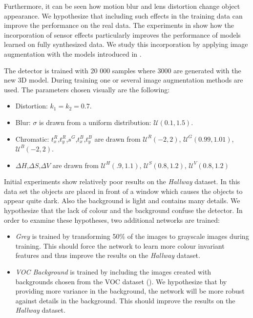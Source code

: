 Furthermore, it can be seen how motion blur and lens distortion change object appearance. We hypothesize that including such effects in the training data can improve the performance on the real data. The experiments in \cite{Carlson2018} show how the incorporation of sensor effects particularly improves the performance of models learned on fully synthesized data. We study this incorporation by applying image augmentation with the models introduced in .

The detector is trained with 20 000 samples where 3000 are generated with the new 3D model. During training one or several image augmentation methods are used. The parameters chosen visually are the following:

\begin{itemize}
	\item Distortion: $k_1 = k_2 = 0.7$.
	\item Blur: $\sigma$ is drawn from a uniform distribution: $\mathcal{U}(0.1,1.5)$.
	\item Chromatic: $t^R_x$,$t^R_y$,$s^G$,$t^B_x$,$t^B_y$ are drawn from $\mathcal{U}^R(-2,2)$, $\mathcal{U}^G(0.99,1.01)$,$\mathcal{U}^B(-2,2)$.
	\item $\Delta H$,$\Delta S$,$\Delta V$ are drawn from $\mathcal{U}^H(.9, 1.1)$, $\mathcal{U}^S(0.8, 1.2)$, $\mathcal{U}^V(0.8, 1.2)$
\end{itemize}

Initial experiments show relatively poor results on the \textit{Hallway} dataset. In this data set the objects are placed in front of a window which causes the objects to appear quite dark. Also the background is light and contains many details. We hypothesize that the lack of colour and the background confuse the detector. In order to examine these hypotheses, two additional networks are trained:

\begin{itemize}
	\item \textit{Grey} is trained by transforming 50\% of the images to grayscale images during training. This should force the network to learn more colour invariant features and thus improve the results on the \textit{Hallway} dataset. 
	\item \textit{VOC Background} is trained by including the images created with backgrounds chosen from the VOC dataset (). We hypothesize that by providing more variance in the background, the network will be more robust against details in the background. This should improve the results on the \textit{Hallway} dataset.
\end{itemize}


